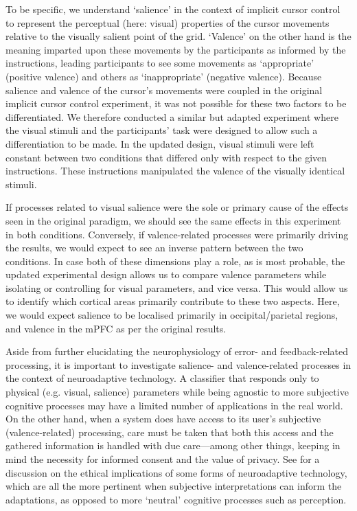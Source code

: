 To be specific, we understand `salience' in the context of implicit cursor control to represent the perceptual (here: visual) properties of the cursor movements relative to the visually salient point of the grid. `Valence' on the other hand is the meaning imparted upon these movements by the participants as informed by the instructions, leading participants to see some movements as `appropriate' (positive valence) and others as `inappropriate' (negative valence). Because salience and valence of the cursor's movements were coupled in the original implicit cursor control experiment, it was not possible for these two factors to be differentiated. We therefore conducted a similar but adapted experiment where the visual stimuli and the participants' task were designed to allow such a differentiation to be made. In the updated design, visual stimuli were left constant between two conditions that differed only with respect to the given instructions. These instructions manipulated the valence of the visually identical stimuli. 

If processes related to visual salience were the sole or primary cause of the effects seen in the original paradigm, we should see the same effects in this experiment in both conditions. Conversely, if valence-related processes were primarily driving the results, we would expect to see an inverse pattern between the two conditions. In case both of these dimensions play a role, as is most probable, the updated experimental design allows us to compare valence parameters while isolating or controlling for visual parameters, and vice versa. This would allow us to identify which cortical areas primarily contribute to these two aspects. Here, we would expect salience to be localised primarily in occipital/parietal regions, and valence in the mPFC as per the original results.

Aside from further elucidating the neurophysiology of error- and feedback-related processing, it is important to investigate salience- and valence-related processes in the context of neuroadaptive technology. A classifier that responds only to physical (e.g. visual, salience) parameters while being agnostic to more subjective cognitive processes may have a limited number of applications in the real world. On the other hand, when a system does have access to its user's subjective (valence-related) processing, care must be taken that both this access and the gathered information is handled with due care---among other things, keeping in mind the necessity for informed consent and the value of privacy. See  for a discussion on the ethical implications of some forms of neuroadaptive technology, which are all the more pertinent when subjective interpretations can inform the adaptations, as opposed to more `neutral' cognitive processes such as perception.



